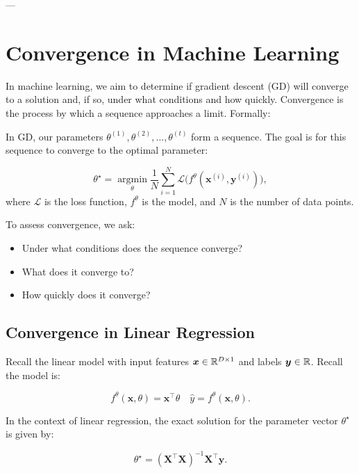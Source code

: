 ---

\section{Convergence in Machine Learning}

In machine learning, we aim to determine if gradient descent (GD) will converge to a solution and, if so, under what conditions and how quickly. Convergence is the process by which a sequence approaches a limit. Formally:


In GD, our parameters \(\theta^{(1)}, \theta^{(2)}, \dots, \theta^{(t)}\) form a sequence. The goal is for this sequence to converge to the optimal parameter:

\[
    \theta^\star = \underset{\theta}{\operatorname*{argmin}} \frac{1}{N} \sum_{i=1}^N \mathcal{L}\big(f^\theta(\boldsymbol{x}^{(i)}, \boldsymbol{y}^{(i)})\big),
\]
where \(\mathcal{L}\) is the loss function, \(f^\theta\) is the model, and \(N\) is the number of data points.

To assess convergence, we ask:

\begin{itemize}
    \item Under what conditions does the sequence converge?
    \item What does it converge to?
    \item How quickly does it converge?
\end{itemize}

\subsection{Convergence in Linear Regression}

Recall the linear model with input features $\bm{x} \in \mathbb{R}^{D \times 1}$ and labels $\bm{y} \in \mathbb{R}$. Recall the model is:

\[
    f^\theta(\bm{x}, \theta) = \bm{x}^\top \theta \quad \hat{y} = f^\theta(\bm{x}, \theta).
\]

In the context of linear regression, the exact solution for the parameter vector \(\theta^\star\) is given by:

\[
    \theta^\star = (\boldsymbol{X}^\top \boldsymbol{X})^{-1} \boldsymbol{X}^\top \boldsymbol{y}.
\]

